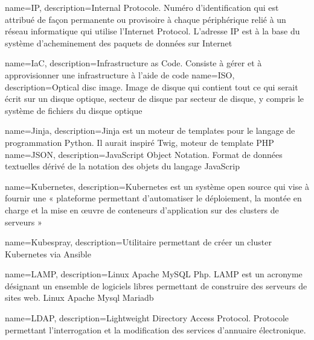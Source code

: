{
    name=IP,
    description={Internal Protocole. Numéro d'identification qui est attribué de façon permanente ou provisoire à chaque périphérique relié à un réseau informatique qui utilise l'Internet Protocol. L'adresse IP est à la base du système d'acheminement des paquets de données sur Internet}
}

{
    name=IaC,
    description={Infrastructure as Code. Consiste à gérer et à approvisionner une infrastructure à l'aide de code}
}
{
    name=ISO,
    description={Optical disc image. Image de disque qui contient tout ce qui serait écrit sur un disque optique, secteur de disque par secteur de disque, y compris le système de fichiers du disque optique}
}


{
    name=Jinja,
    description={Jinja est un moteur de templates pour le langage de programmation Python. Il aurait inspiré Twig, moteur de template PHP}
}
{
    name=JSON,
    description={JavaScript Object Notation. Format de données textuelles dérivé de la notation des objets du langage JavaScrip}
}


{
    name=Kubernetes,
    description={Kubernetes est un système open source qui vise à fournir une « plateforme permettant d'automatiser le déploiement, la montée en charge et la mise en œuvre de conteneurs d'application sur des clusters de serveurs »}
}

{
    name=Kubespray,
    description={Utilitaire permettant de créer un cluster Kubernetes via Ansible}
}

{
    name=LAMP,
    description={Linux Apache MySQL Php. LAMP est un acronyme désignant un ensemble de logiciels libres permettant de construire des serveurs de sites web. Linux Apache Mysql Mariadb}
}

{
    name=LDAP,
    description={Lightweight Directory Access Protocol. Protocole permettant l'interrogation et la modification des services d'annuaire électronique.}
}

